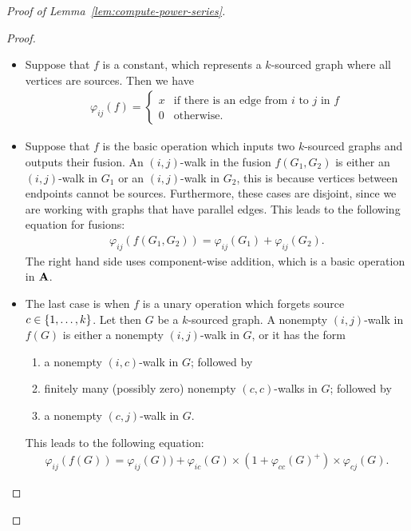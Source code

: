 \begin{proof}[Proof of Lemma~\ref{lem:compute-power-series}]
\begin{proof}
		\begin{itemize}
			\item Suppose that $f$ is a constant, which represents a  $k$-sourced graph where all vertices are sources. Then we have 
			\begin{align*}
			\varphi_{ij}(f) = \begin{cases}
			x & \text{if there is an edge from $i$ to $j$ in $f$}\\
			0 & \text{otherwise.}
			\end{cases}
			\end{align*}
			\item Suppose that $f$ is the  basic operation which inputs two $k$-sourced graphs and outputs their fusion.  
			An $(i,j)$-walk in the fusion $f(G_1,G_2)$ is either an $(i,j)$-walk in $G_1$ or an $(i,j)$-walk in $G_2$, this is because vertices between endpoints cannot be sources. Furthermore, these cases are disjoint, since we are working with graphs that have parallel edges.
			This leads to the following equation for fusions:
			\begin{align*}
			\varphi_{ij}(f(G_1, G_2)) = \varphi_{ij}(G_1) + \varphi_{ij}(G_2).
			\end{align*}
			The right hand side uses component-wise addition, which is a basic operation in $\mathbf{A}$.
			\item The last case is when $f$ is a unary operation which forgets  source $c \in \{1,\ldots,k\}$.  Let then $G$ be a $k$-sourced graph. A nonempty $(i,j)$-walk in $f(G)$ is either a nonempty $(i,j)$-walk in $G$, or it has the form
			\begin{enumerate}
				\item a nonempty $(i,c)$-walk in $G$; followed by 
				\item finitely many (possibly zero) nonempty  $(c,c)$-walks in $G$; followed by
				\item a nonempty $(c,j)$-walk in $G$.
			\end{enumerate}
			This leads to the following equation:
			\begin{align*}
			\varphi_{ij}(f(G)) = \varphi_{ij}(G)) +  \varphi_{ic}(G) \times (1+ \varphi_{cc}(G)^+)  \times \varphi_{cj}(G).
			\end{align*}                
		\end{itemize}
	\end{proof}
\end{proof}

